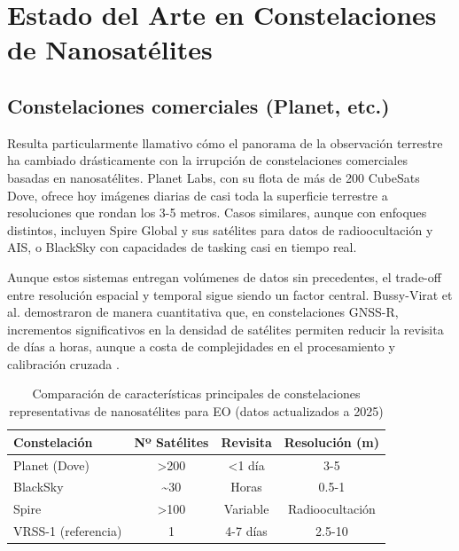 \section{Estado del Arte en Constelaciones de Nanosatélites}

\subsection{Constelaciones comerciales (Planet, etc.)}

Resulta particularmente llamativo cómo el panorama de la observación terrestre ha cambiado drásticamente con la irrupción de constelaciones comerciales basadas en nanosatélites. Planet Labs, con su flota de más de 200 CubeSats Dove, ofrece hoy imágenes diarias de casi toda la superficie terrestre a resoluciones que rondan los 3-5 metros. Casos similares, aunque con enfoques distintos, incluyen Spire Global y sus satélites para datos de radioocultación y AIS, o BlackSky con capacidades de tasking casi en tiempo real.

Aunque estos sistemas entregan volúmenes de datos sin precedentes, el trade-off entre resolución espacial y temporal sigue siendo un factor central. Bussy-Virat et al. demostraron de manera cuantitativa que, en constelaciones GNSS-R, incrementos significativos en la densidad de satélites permiten reducir la revisita de días a horas, aunque a costa de complejidades en el procesamiento y calibración cruzada \cite{BussyVirat2018}. 

\begin{table}[h]
\centering
\caption{Comparación de características principales de constelaciones representativas de nanosatélites para EO (datos actualizados a 2025)}
\label{tab:comparacion_constelaciones}
\begin{tabular}{lccc}
\hline
\textbf{Constelación} & \textbf{Nº Satélites} & \textbf{Revisita} & \textbf{Resolución (m)} \\
\hline
Planet (Dove)         & >200                  & <1 día            & 3-5 \\
BlackSky              & \sim 30               & Horas             & 0.5-1 \\
Spire                 & >100                  & Variable          & Radioocultación \\
VRSS-1 (referencia)   & 1                     & 4-7 días          & 2.5-10 \\
\hline
\end{tabular}
\end{table}

